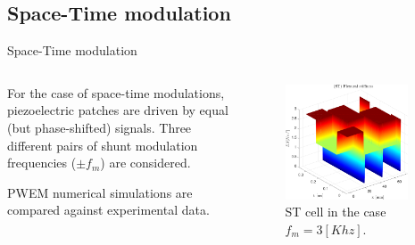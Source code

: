 \subsection{Space-Time modulation}

\begin{frame}{Space-Time modulation}

    \begin{columns}[c, onlytextwidth]

        \begin{column}{0.55\textwidth}

            For the case of space-time modulations, piezoelectric patches are driven by equal (but phase-shifted) signals.
            Three different pairs of shunt modulation frequencies ($\pm f_m$) are considered.

            \vspace{9pt}

            PWEM numerical simulations are compared against experimental data.

        \end{column}

        \begin{column}{0.45\textwidth}

            \begin{figure}[H]
                \centering
                \includegraphics[width=0.9\textwidth]{img/MATLAB/ST_cell_Sinusoidal (discrete) @3kHz.pdf}
                \caption{ST cell in the case $f_m = 3 [Khz]$.}
            \end{figure}


\end{column}
\end{columns}
\end{frame}
